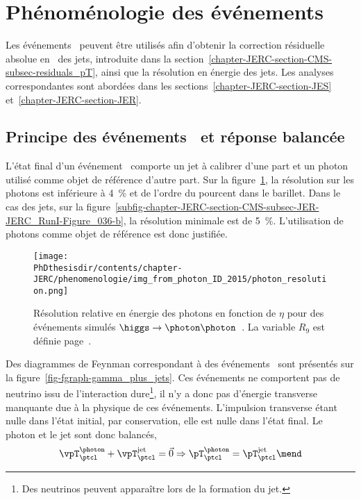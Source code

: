 \section{Phénoménologie des événements \Gjets}\label{chapter-JERC-section-pheno-GJets}
Les événements \Gjets\ peuvent être utilisés afin d'obtenir la correction résiduelle absolue en \pT\ des jets, introduite dans la section~\ref{chapter-JERC-section-CMS-subsec-residuals_pT}, ainsi que la résolution en énergie des jets. Les analyses correspondantes sont abordées dans les sections~\ref{chapter-JERC-section-JES} et~\ref{chapter-JERC-section-JER}.
\subsection{Principe des événements \Gjets\ et réponse balancée}
L'état final d'un événement \Gjets\ comporte un jet à calibrer d'une part et un photon utilisé comme objet de référence d'autre part.
Sur la figure~\ref{fig-chapter-JERC-section-pheno-GJets-photon_resolution}, la résolution sur les photons est inférieure à \SI{4}{\%} et de l'ordre du pourcent dans le barillet. Dans le cas des jets, sur la figure~\ref{subfig-chapter-JERC-section-CMS-subsec-JER-JERC_RunI-Figure_036-b}, la résolution minimale est de \SI{5}{\%}.
L'utilisation de photons comme objet de référence est donc justifiée.
\begin{figure}[h]
\centering
\texttt{[image: \\PhDthesisdir/contents/chapter-JERC/phenomenologie/img\_from\_photon\_ID\_2015/photon\_resolution.png]}
\caption[Résolution en énergie des photons.]{Résolution relative en énergie des photons en fonction de $\eta$ pour des événements simulés $\higgs\to\photon\photon$~\cite{photon_ID_2015}. La variable $R_9$ est définie page~\pageref{eq-R9_definition}.}
\label{fig-chapter-JERC-section-pheno-GJets-photon_resolution}
\end{figure}
\par Des diagrammes de Feynman correspondant à des événements \Gjets\ sont présentés sur la figure~\ref{fig-fgraph-gamma_plus_jets}.
Ces événements ne comportent pas de neutrino issu de l'interaction dure\footnote{Des neutrinos peuvent apparaître lors de la formation du jet.}, il n'y a donc pas d'énergie transverse manquante due à la physique de ces événements.
L'impulsion transverse étant nulle dans l'état initial, par conservation, elle est nulle dans l'état final. Le photon et le jet sont donc balancés, \ie
\begin{equation}
\vpT_\ptcl^{\photon} + \vpT_\ptcl^\text{jet} = \vec{0}
\Rightarrow
\pT_\ptcl^{\photon} = \pT_\ptcl^\text{jet}
\mend
\end{equation}
